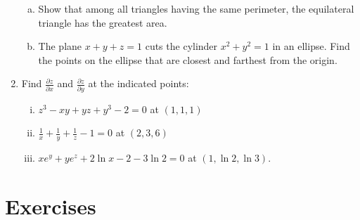 \documentclass[journal,12pt,twocolumn]{IEEEtran}
\begin{document}
\begin{enumerate}
\begin{enumerate}[(a)]
\item Show that among all triangles having the same perimeter, the equilateral triangle has the
greatest area.

\item The plane $x+y+z=1$ cuts the cylinder $x^2+y^2=1$ in an ellipse. Find the points on the ellipse that are closest and farthest from the origin.

\end{enumerate}

\item Find $\frac{\partial z}{\partial x} $ and $\frac{\partial z}{\partial y}$ at the indicated points:

\begin{enumerate}[(i)]

\item $z^3-xy+yz+y^3-2=0 $ at $(1,1,1)$

\item $\frac{1}{x}+\frac{1}{y}+\frac{1}{z}-1=0 $  at $(2,3,6)$

\item $ xe^y+ye^z+2 \ln x-2-3 \ln 2=0 $  at $(1, \ln 2, \ln 3)$.

\end{enumerate}


\end{enumerate}

\section{Exercises}
\end{document}
